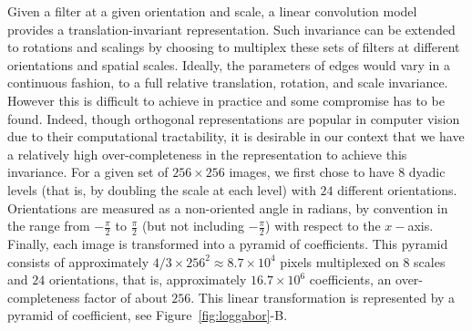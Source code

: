 \documentclass[a4paper, 11pt]{book}
\begin{document}
Given a filter at a given orientation and scale,
a linear convolution model provides a translation-invariant representation.
Such invariance can be extended to rotations and scalings
by choosing to multiplex these sets of filters at different orientations and spatial scales.
Ideally, the parameters of edges would vary in a continuous fashion,
to a full relative translation, rotation, and scale invariance.
However this is difficult to achieve in practice and some compromise has to be found.
Indeed, though orthogonal representations are popular in computer vision
due to their computational tractability,
it is desirable in our context that we have a relatively high over-completeness
in the representation to achieve this invariance.
For a given set of $256\times 256$ images, we first chose to have $8$ dyadic levels (that is, by doubling the scale at each level)
 with $24$ different orientations.
Orientations are measured as a non-oriented angle in radians, by convention
in the range from $-\frac{\pi}{2}$ to $\frac{\pi}{2}$ (but not including $-\frac{\pi}{2}$) with respect to the $x-$axis.
Finally, each image is transformed into a pyramid of coefficients.
This pyramid consists of approximately $4/3\times256^{2}\approx8.7\times10^4$ pixels
multiplexed on $8$ scales and $24$ orientations, that is,
approximately $16.7\times10^6$ coefficients, an over-completeness factor of about $256$.
This linear transformation is represented by a pyramid of coefficient, see Figure~\ref{fig:loggabor}-B.
%
\end{document}
